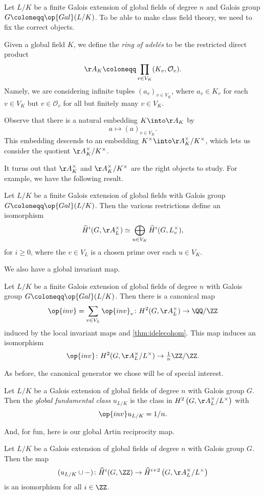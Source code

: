 Let $L/K$ be a finite Galois extension of global fields of degree $n$ and Galois group $G\coloneqq\op{Gal}(L/K)$. To be able to make class field theory, we need to fix the correct objects.
\begin{definition}
	Given a global field $K$, we define the \textit{ring of adel\'es} to be the restricted direct product
	\[\AA_K\coloneqq\prod_{v\in V_K}(K_v,\mathcal O_v).\]
	Namely, we are considering infinite tuples $(a_v)_{v\in V_K}$, where $a_v\in K_v$ for each $v\in V_K$ but $v\in\mathcal O_v$ for all but finitely many $v\in V_K$.
\end{definition}
Observe that there is a natural embedding $K\into\AA_K$ by
\[a\mapsto(a)_{v\in V_K}.\]
This embedding descends to an embedding $K^\times\into\AA_K^\times/K^\times$, which lets us consider the quotient $\AA_K^\times/K^\times$.

It turns out that $\AA_K^\times$ and $\AA_K^\times/K^\times$ are the right objects to study. For example, we have the following result.
\begin{theorem} \label{thm:idelecohom}
	Let $L/K$ be a finite Galois extension of global fields with Galois group $G\coloneqq\op{Gal}(L/K)$. Then the various restrictions define an isomorphism
	\[\widehat H^i(G,\AA_L^\times)\simeq\bigoplus_{u\in V_K}\widehat H^i(G,L_v^\times),\]
	for $i\ge0$, where the $v\in V_L$ is a chosen prime over each $u\in V_K$.
\end{theorem}
We also have a global invariant map.
\begin{theorem}
	Let $L/K$ be a finite Galois extension of global fields of degree $n$ with Galois group $G\coloneqq\op{Gal}(L/K)$. Then there is a canonical map
	\[\op{inv}=\sum_{v\in V_L}\op{inv}_v\colon H^2(G,\AA_L^\times)\to\QQ/\ZZ\]
	induced by the local invariant maps and \autoref{thm:idelecohom}. This map induces an isomorphism
	\[\op{inv}\colon H^2(G,\AA_L^\times/L^\times)\to{\textstyle\frac1n}\ZZ/\ZZ.\]
\end{theorem}
As before, the canonical generator we chose will be of special interest.
\begin{definition}
	Let $L/K$ be a Galois extension of global fields of degree $n$ with Galois group $G$. Then the \textit{global fundamental class} $u_{L/K}$ is the class in $H^2\left(G,\AA_L^\times/L^\times\right)$ with
	\[\op{inv}u_{L/K}=1/n.\]
\end{definition}
And, for fun, here is our global Artin reciprocity map.
\begin{theorem}
	Let $L/K$ be a Galois extension of global fields of degree $n$ with Galois group $G$. Then the map
	\[(u_{L/K}\cup-)\colon\widehat H^i(G,\ZZ)\to\widehat H^{i+2}\left(G,\AA_L^\times/L^\times\right)\]
	is an isomorphism for all $i\in\ZZ$.
\end{theorem}

